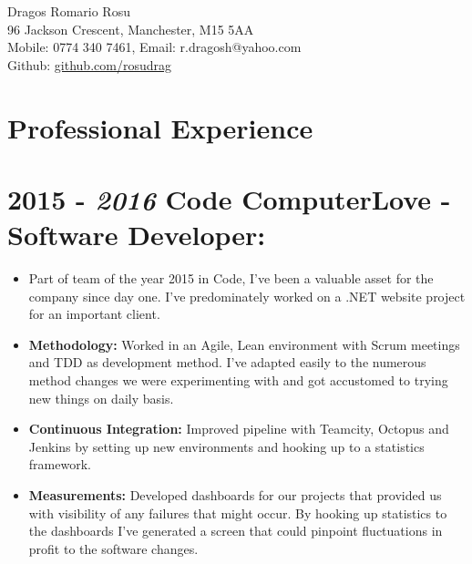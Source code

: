 \documentclass[12pt,a4paper]{res}
\begin{document}
\thispagestyle{empty}
  \begin{center}
  \Large{Dragos Romario Rosu  \\ [12pt]}
  \normalsize 96 Jackson Crescent, Manchester, M15 5AA\\
  Mobile: 0774 340 7461, Email: r.dragosh@yahoo.com\\
  Github: \url{github.com/rosudrag}
  \end{center}
  
\begin{resume}
\vspace{-10mm}
\section{\large\bf Professional Experience}

\section{\bf 2015 - \textit{2016} \hspace{0.3mm} Code ComputerLove - Software Developer:}
\vspace{5mm}    
	\begin{itemize}
	\item[] Part of team of the year 2015 in Code, I've been a valuable asset for the company since day one. I've predominately worked on a .NET website project for an important client.
	\item \textbf{Methodology:} Worked in an Agile, Lean environment with Scrum meetings and TDD as development method. I've adapted easily to the numerous method changes we were experimenting with and got accustomed to trying new things on daily basis.
	\item \textbf{Continuous Integration:} Improved pipeline with Teamcity, Octopus and Jenkins by setting up new environments and hooking up to a statistics framework.
	\item \textbf{Measurements:} Developed dashboards for our projects that provided us with visibility of any failures that might occur. By hooking up statistics to the dashboards I've generated a screen that could pinpoint fluctuations in profit to the software changes.
	\end{itemize}
	

\end{resume}
\end{document}
